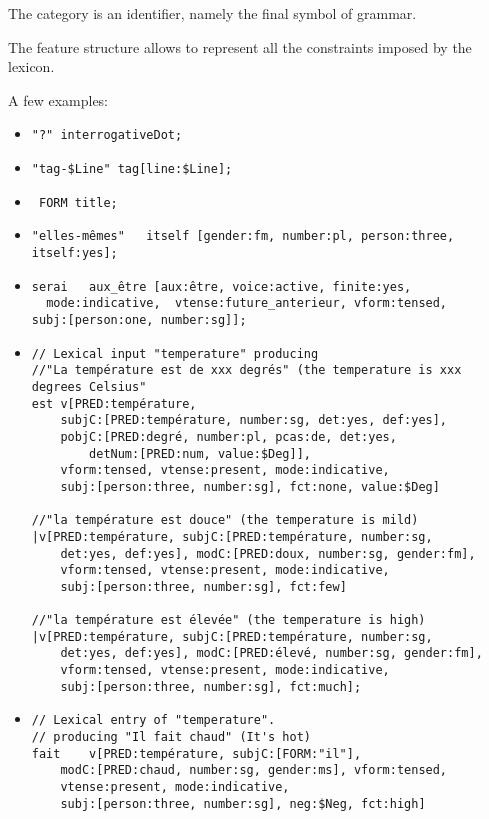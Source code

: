 \documentclass[11pt]{article}
\begin{document}
The category is an identifier, namely the final symbol of grammar.

The feature structure allows to represent all the
constraints imposed by the lexicon.

A few examples:

\begin{itemize}
\item \verb#"?" interrogativeDot;#

\bigskip
\item \verb#"tag-$Line" tag[line:$Line]; #

\bigskip
\item \verb# FORM title; #

\bigskip
\item \verb#"elles-mêmes"	itself [gender:fm, number:pl, person:three, itself:yes]; #

\bigskip
\item \begin{verbatim}
serai	aux_être [aux:être, voice:active, finite:yes,
  mode:indicative,  vtense:future_anterieur, vform:tensed, 
subj:[person:one, number:sg]]; 
\end{verbatim}

\bigskip
\item \begin{verbatim}
// Lexical input "temperature" producing 
//"La température est de xxx degrés" (the temperature is xxx degrees Celsius"
est v[PRED:température, 
	subjC:[PRED:température, number:sg, det:yes, def:yes], 
	pobjC:[PRED:degré, number:pl, pcas:de, det:yes,
		detNum:[PRED:num, value:$Deg]], 
	vform:tensed, vtense:present, mode:indicative, 
	subj:[person:three, number:sg], fct:none, value:$Deg]

//"la température est douce" (the temperature is mild)
|v[PRED:température, subjC:[PRED:température, number:sg, 
	det:yes, def:yes], modC:[PRED:doux, number:sg, gender:fm],
	vform:tensed, vtense:present, mode:indicative, 
	subj:[person:three, number:sg], fct:few]

//"la température est élevée" (the temperature is high)
|v[PRED:température, subjC:[PRED:température, number:sg, 
	det:yes, def:yes], modC:[PRED:élevé, number:sg, gender:fm],
	vform:tensed, vtense:present, mode:indicative, 
	subj:[person:three, number:sg], fct:much];
\end{verbatim}

\bigskip
\item \begin{verbatim}
// Lexical entry of "temperature".
// producing "Il fait chaud" (It's hot)
fait	v[PRED:température, subjC:[FORM:"il"], 
	modC:[PRED:chaud, number:sg, gender:ms], vform:tensed,
	vtense:present, mode:indicative, 
	subj:[person:three, number:sg], neg:$Neg, fct:high]


\end{verbatim}
\end{itemize}
\end{document}
